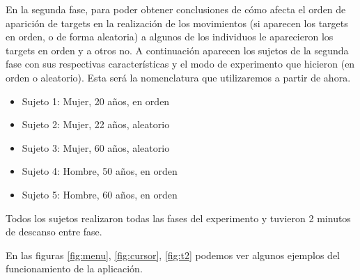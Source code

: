 \documentclass[a4paper,11pt, oneside]{book}
\begin{document}
En la segunda fase, para poder obtener conclusiones de cómo afecta el orden de aparición de targets en la realización de los movimientos (si aparecen los targets en orden, o de forma aleatoria) a algunos de los individuos le aparecieron los targets en orden y a otros no. A continuación aparecen los sujetos de la segunda fase con sus respectivas características y el modo de experimento que hicieron (en orden o aleatorio). Esta será la nomenclatura que utilizaremos a partir de ahora.

\begin{itemize}
	\item Sujeto 1: Mujer, 20 años, en orden
	\item Sujeto 2: Mujer, 22 años, aleatorio
	\item Sujeto 3: Mujer, 60 años, aleatorio
	\item Sujeto 4: Hombre, 50 años, en orden
	\item Sujeto 5: Hombre, 60 años, en orden
\end{itemize}

Todos los sujetos realizaron todas las fases del experimento y tuvieron 2 minutos de descanso entre fase.

En las figuras \ref{fig:menu}, \ref{fig:cursor}, \ref{fig:t2} podemos ver algunos ejemplos del funcionamiento de la aplicación.
\end{document}
